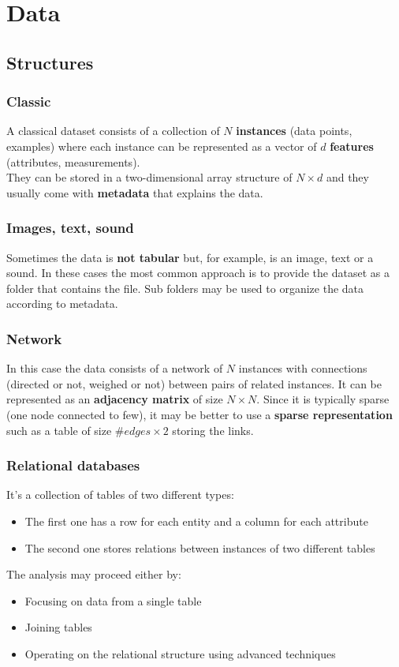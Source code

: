 \newpage
\section{Data}
\subsection{Structures}
\subsubsection{Classic}
A classical dataset consists of a collection of $N$ \textbf{instances} (data points, examples) where each instance can be represented as a vector of $d$ \textbf{features} (attributes, measurements).\\
They can be stored in a two-dimensional array structure of $N \times d$ and they usually come with \textbf{metadata} that explains the data. 
\subsubsection{Images, text, sound}
Sometimes the data is \textbf{not tabular} but, for example, is an image, text or a sound. In these cases the most common approach is to provide the dataset as a folder that contains the file. Sub folders may be used to organize the data according to metadata. 
\subsubsection{Network}
In this case the data consists of a network of $N$ instances with connections (directed or not, weighed or not) between pairs of related instances. It can be represented as an \textbf{adjacency matrix} of size $N \times N$. Since it is typically sparse (one node connected to few), it may be better to use a \textbf{sparse representation} such as a table of size $\#edges \times 2$ storing the links.
\subsubsection{Relational databases}
It's a collection of tables of two different types:
\begin{itemize}
	\item The first one has a row for each entity and a column for each attribute
	\item The second one stores relations between instances of two different tables
\end{itemize}
The analysis may proceed either by:
\begin{itemize}
	\item Focusing on data from a single table
	\item Joining tables
	\item Operating on the relational structure using advanced techniques 
\end{itemize}

